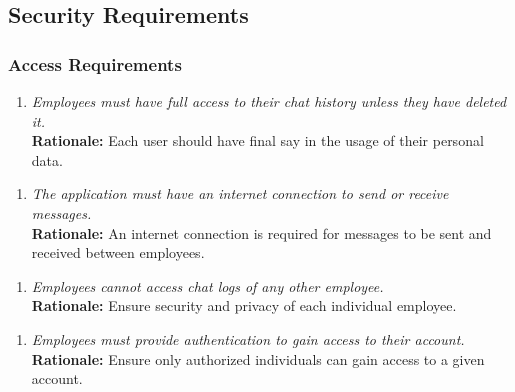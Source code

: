 \documentclass[]{article}
\begin{document}
\begin{enumerate}[{\bf BE1.}]


\subsection{Security Requirements}
\label{sub:security_requirements}


\subsubsection{Access Requirements}
\label{ssub:access_requirements}
\begin{enumerate}[{SR-AC}1. ]
    \item \emph{Employees must have full access to their chat history unless they have deleted it.}\\
    {\bf Rationale:} Each user should have final say in the usage of their personal data.
\end{enumerate}
\begin{enumerate}[{SR-AC}2. ]
    \item \emph{The application must have an internet connection to send or receive messages.}\\
    {\bf Rationale:} An internet connection is required for messages to be sent and received between employees.
\end{enumerate}
\begin{enumerate}[{SR-AC}3. ]
    \item \emph{Employees cannot access chat logs of any other employee.}\\
    {\bf Rationale:} Ensure security and privacy of each individual employee.
\end{enumerate}
\begin{enumerate}[{SR-AC}4. ]
    \item \emph{Employees must provide authentication to gain access to their account. }\\
    {\bf Rationale:} Ensure only authorized individuals can gain access to a given account.
\end{enumerate}



\end{enumerate}
\end{document}
